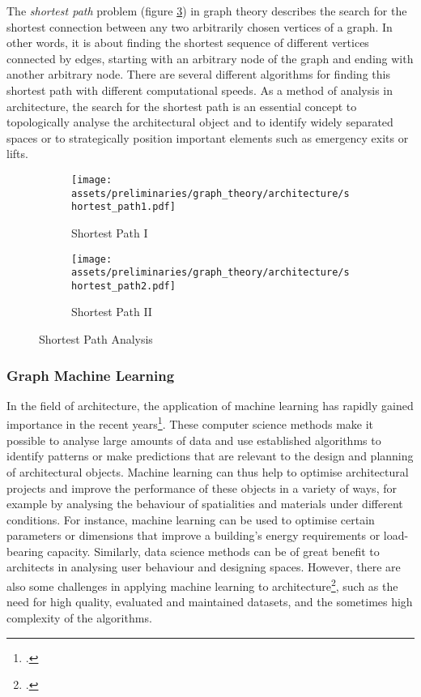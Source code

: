\documentclass[a4paper, 12pt]{report}
\begin{document}
The \textit{shortest path} problem (figure \ref{fig:shortest-path-analysis}) in graph theory describes the search for the shortest connection between any two arbitrarily chosen vertices of a graph. In other words, it is about finding the shortest sequence of different vertices connected by edges, starting with an arbitrary node of the graph and ending with another arbitrary node. There are several different algorithms for finding this shortest path with different computational speeds. As a method of analysis in architecture, the search for the shortest path is an essential concept to topologically analyse the architectural object and to identify widely separated spaces or to strategically position important elements such as emergency exits or lifts.

\begin{figure}
\centering
\begin{subfigure}{.5\textwidth}
\centering
\texttt{[image: assets/preliminaries/graph\_theory/architecture/shortest\_path1.pdf]}
\caption{Shortest Path I}
\label{fig:shortest-path-i}
\end{subfigure}%
\begin{subfigure}{.5\textwidth}
\centering
\texttt{[image: assets/preliminaries/graph\_theory/architecture/shortest\_path2.pdf]}
\caption{Shortest Path II}
\label{fig:shortest-path-ii}
\end{subfigure}
\caption{Shortest Path Analysis}
\label{fig:shortest-path-analysis}
\end{figure}

\subsubsection{Graph Machine Learning}\label{subsec:graph-machine-learning}

In the field of architecture, the application of machine learning has rapidly gained importance in the recent years\footcite{belem2019impact}. These computer science methods make it possible to analyse large amounts of data and use established algorithms to identify patterns or make predictions that are relevant to the design and planning of architectural objects. Machine learning can thus help to optimise architectural projects and improve the performance of these objects in a variety of ways, for example by analysing the behaviour of spatialities and materials under different conditions. For instance, machine learning can be used to optimise certain parameters or dimensions that improve a building's energy requirements or load-bearing capacity. Similarly, data science methods can be of great benefit to architects in analysing user behaviour and designing spaces. However, there are also some challenges in applying machine learning to architecture\footcite{pena2021artificial}, such as the need for high quality, evaluated and maintained datasets, and the sometimes high complexity of the algorithms.
\end{document}
